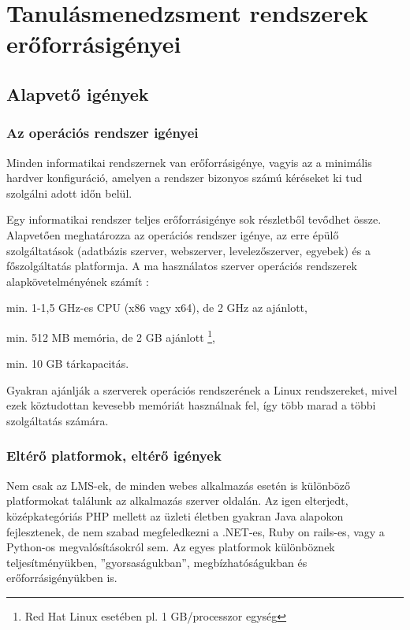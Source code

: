 \chapter{Tanulásmenedzsment rendszerek erőforrásigényei}
\section{Alapvető igények}
\subsection{Az operációs rendszer igényei}
Minden informatikai rendszernek van erőforrásigénye, vagyis az a minimális hardver konfiguráció, amelyen a rendszer bizonyos számú kéréseket ki tud szolgálni adott időn belül.


Egy informatikai rendszer teljes erőforrásigénye sok részletből tevődhet össze. Alapvetően meghatározza az operációs rendszer igénye, az erre épülő szolgáltatások (adatbázis szerver, webszerver, levelezőszerver, egyebek) és a főszolgáltatás platformja.
A ma használatos szerver operációs rendszerek alapkövetelményének számít \cite{ws2008sr,ubuntuminhr,redhatcaplim}:

\begin{sajat_itemize}
\item min. 1-1,5 GHz-es CPU (x86 vagy x64), de 2 GHz az ajánlott,
\item min. 512 MB memória, de 2 GB ajánlott \footnote{Red Hat Linux esetében pl. 1 GB/processzor egység},
\item min. 10 GB tárkapacitás.
\end{sajat_itemize}

Gyakran ajánlják a szerverek operációs rendszerének a Linux rendszereket, mivel ezek köztudottan kevesebb memóriát használnak fel, így több marad a többi szolgáltatás számára. 

\subsection{Eltérő platformok, eltérő igények}
Nem csak az LMS-ek, de minden webes alkalmazás esetén is különböző platformokat találunk az alkalmazás szerver oldalán. Az igen elterjedt, középkategóriás PHP mellett az üzleti életben gyakran Java alapokon fejlesztenek, de nem szabad megfeledkezni a .NET-es, Ruby on rails-es, vagy a Python-os megvalósításokról sem. Az egyes platformok különböznek teljesítményükben, ''gyorsaságukban'', megbízhatóságukban és erőforrásigényükben is.

